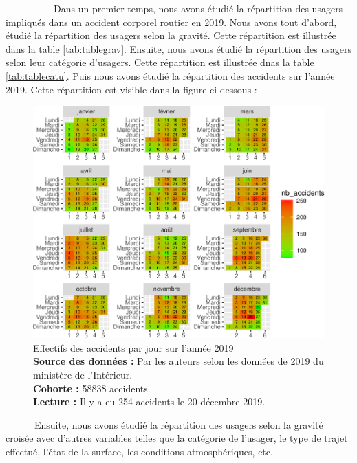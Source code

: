 \documentclass[french,]{tp}
\begin{document}
~~~~~~~~~~Dans un premier temps, nous avons étudié la répartition des usagers impliqués dans un accident corporel routier en 2019. Nous avons tout d'abord, étudié la répartition des usagers selon la gravité. Cette répartition est illustrée dans la table \ref{tab:tablegrav}. Ensuite, nous avons étudié la répartition des usagers selon leur catégorie d'usagers. Cette répartition est illustrée dnas la table \ref{tab:tablecatu}. Puis nous avons étudié la répartition des accidents sur l'année 2019. Cette répartition est visible dans la figure ci-dessous :






\begin{figure}[ht!]

{\centering \includegraphics{Prediction_Gravite_files/figure-latex/calendrier-1} 

}

\caption{Effectifs des accidents par jour sur l'année 2019\\
\textbf{Source des données :} Par les auteurs selon les données de 2019 du ministère de l'Intérieur.\\
\textbf{Cohorte :} 58838 accidents.\\
\textbf{Lecture :} Il y a eu 254 accidents le 20 décembre 2019.}\label{fig:calendrier}
\end{figure}

\newpage

~~~~~~Ensuite, nous avons étudié la répartition des usagers selon la gravité croisée avec d'autres variables telles que la catégorie de l'usager, le type de trajet effectué, l'état de la surface, les conditions atmosphériques, etc.
\end{document}
